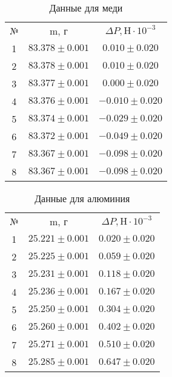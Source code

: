 \documentclass[a4paper]{article}
\begin{document}
    \begin{table}[h]
    \centering
        \begin{tabular}{|c|c|c|}
        \cline{1-3}
        № & m, $\text{г}$ & $\Delta P, \text{H}\cdot 10^{-3}$\\ \cline{1-3}
        1&  $83.378\pm 0.001$& $0.010 \pm 0.020$\\ \cline{1-3}
        2&  $83.378\pm 0.001$& $0.010 \pm 0.020$\\ \cline{1-3}
        3&  $83.377\pm 0.001$& $0.000 \pm 0.020$\\ \cline{1-3}
        4&  $83.376\pm 0.001$& $-0.010 \pm 0.020$\\ \cline{1-3}
        5&  $83.374\pm 0.001$& $-0.029 \pm 0.020$\\ \cline{1-3}
        6&  $83.372\pm 0.001$& $-0.049 \pm 0.020$\\ \cline{1-3}
        7&  $83.367\pm 0.001$& $-0.098 \pm 0.020$\\ \cline{1-3}
        8&  $83.367\pm 0.001$& $-0.098 \pm 0.020$\\ \cline{1-3}
        \end{tabular}
        \caption{Данные для меди}
        \label{tab:my_label}
    \end{table}

        \begin{table}[h]
    \centering
        \begin{tabular}{|c|c|c|}
        \cline{1-3}
        № & m, $\text{г}$ & $\Delta P, \text{H}\cdot 10^{-3}$\\ \cline{1-3}
        1&  $25.221\pm 0.001$& $0.020 \pm 0.020$\\ \cline{1-3}
        2&  $25.225\pm 0.001$& $0.059 \pm 0.020$\\ \cline{1-3}
        3&  $25.231\pm 0.001$& $0.118 \pm 0.020$\\ \cline{1-3}
        4&  $25.236\pm 0.001$& $0.167 \pm 0.020$\\ \cline{1-3}
        5&  $25.250\pm 0.001$& $0.304 \pm 0.020$\\ \cline{1-3}
        6&  $25.260\pm 0.001$& $0.402 \pm 0.020$\\ \cline{1-3}
        7&  $25.271\pm 0.001$& $0.510 \pm 0.020$\\ \cline{1-3}
        8&  $25.285\pm 0.001$& $0.647 \pm 0.020$\\ \cline{1-3}
        \end{tabular}
        \caption{Данные для алюминия}
        \label{tab:my_label}
    \end{table}
\end{document}
